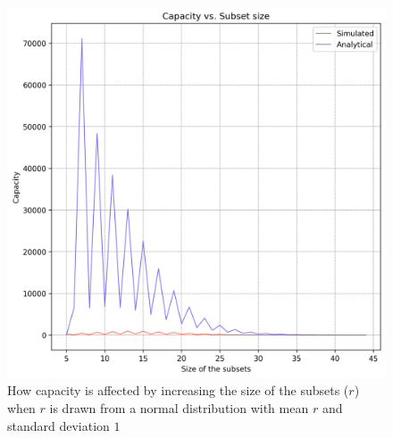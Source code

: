 \begin{figure}%
    \centering
    \includegraphics[scale=0.83]{figures/cap-vs-r-bounded.png}
    \caption[Capacity vs. Size of the subsets ($r$) when $r \sim \mathcal{N}(r,1)$ ]{How capacity is affected by increasing the size of the subsets ($r$) when $r$ is drawn from a normal distribution with mean $r$ and standard deviation $1$}
    \label{figure:cap-vs-r-bounded}
    \end{figure}

